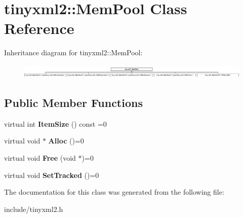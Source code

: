 \hypertarget{classtinyxml2_1_1MemPool}{}\section{tinyxml2\+::Mem\+Pool Class Reference}
\label{classtinyxml2_1_1MemPool}
Inheritance diagram for tinyxml2\+::Mem\+Pool\+:\begin{figure}[H]
\begin{center}
\leavevmode
\includegraphics[height=0.691358cm]{classtinyxml2_1_1MemPool}
\end{center}
\end{figure}
\subsection*{Public Member Functions}
\begin{DoxyCompactItemize}
\item 
\mbox{\label{classtinyxml2_1_1MemPool_a0c518d49e3a94bde566f61e13b7240bb}} 
virtual int {\bfseries Item\+Size} () const =0
\item 
\mbox{\label{classtinyxml2_1_1MemPool_a4f977b5fed752c0bbfe5295f469d6449}} 
virtual void $\ast$ {\bfseries Alloc} ()=0
\item 
\mbox{\label{classtinyxml2_1_1MemPool_a49e3bfac2cba2ebd6776b31e571f64f7}} 
virtual void {\bfseries Free} (void $\ast$)=0
\item 
\mbox{\label{classtinyxml2_1_1MemPool_ac5804dd1387b2e4de5eef710076a0db1}} 
virtual void {\bfseries Set\+Tracked} ()=0
\end{DoxyCompactItemize}


The documentation for this class was generated from the following file\+:\begin{DoxyCompactItemize}
\item 
include/tinyxml2.\+h\end{DoxyCompactItemize}
